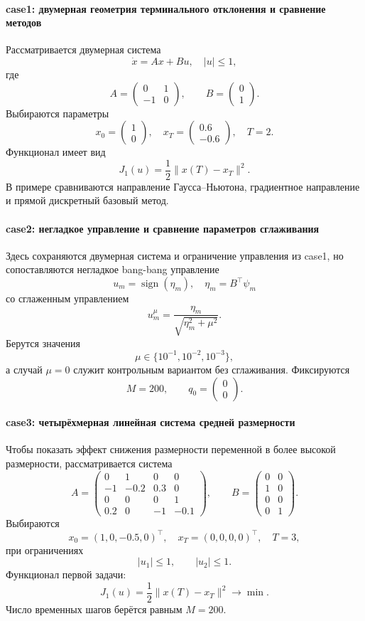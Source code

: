 \documentclass[a4paper,12pt]{article}
\begin{document}
\paragraph{case1: двумерная геометрия терминального отклонения и сравнение методов}
Рассматривается двумерная система
\[
\dot{x}=Ax+Bu,\quad |u|\le 1,
\]
где
\[
A=
\begin{pmatrix}
0&1\\
-1&0
\end{pmatrix},
\qquad
B=
\begin{pmatrix}
0\\
1
\end{pmatrix}.
\]
Выбираются параметры
\[
x_0=
\begin{pmatrix}
1\\
0
\end{pmatrix},
\quad
x_T=
\begin{pmatrix}
0.6\\
-0.6
\end{pmatrix},
\quad
T=2.
\]
Функционал имеет вид
\[
J_1(u)=\frac12\|x(T)-x_T\|^2.
\]
В примере сравниваются направление Гаусса--Ньютона, градиентное направление и прямой дискретный базовый метод.

\paragraph{case2: негладкое управление и сравнение параметров сглаживания}
Здесь сохраняются двумерная система и ограничение управления из case1, но сопоставляются негладкое bang-bang управление
\[
u_m=\operatorname{sign}(\eta_m),\quad \eta_m=B^\top\psi_m
\]
со сглаженным управлением
\[
u_m^\mu=\frac{\eta_m}{\sqrt{\eta_m^2+\mu^2}}.
\]
Берутся значения
\[
\mu\in\{10^{-1},10^{-2},10^{-3}\},
\]
а случай $\mu=0$ служит контрольным вариантом без сглаживания. Фиксируются
\[
M=200,\qquad q_0=
\begin{pmatrix}
0\\
0
\end{pmatrix}.
\]

\paragraph{case3: четырёхмерная линейная система средней размерности}
Чтобы показать эффект снижения размерности переменной в более высокой размерности, рассматривается система
\[
A=
\begin{pmatrix}
0&1&0&0\\
-1&-0.2&0.3&0\\
0&0&0&1\\
0.2&0&-1&-0.1
\end{pmatrix},
\qquad
B=
\begin{pmatrix}
0&0\\
1&0\\
0&0\\
0&1
\end{pmatrix}.
\]
Выбираются
\[
x_0=(1,0,-0.5,0)^\top,\quad x_T=(0,0,0,0)^\top,\quad T=3,
\]
при ограничениях
\[
|u_1|\le 1,\qquad |u_2|\le 1.
\]
Функционал первой задачи:
\[
J_1(u)=\frac12\|x(T)-x_T\|^2\to\min.
\]
Число временных шагов берётся равным $M=200$.
\end{document}
